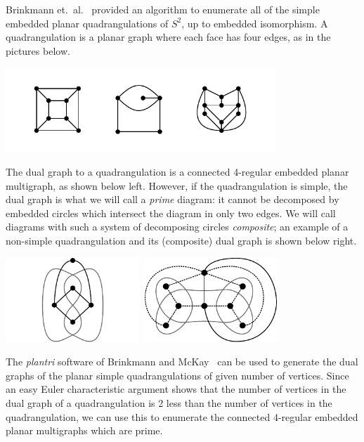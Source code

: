 \documentclass[amsmath,secnumarabic,floatfix,amssymb,nofootinbib,nobibnotes,letterpaper,11pt,tightenlines,showkeys]{revtex4}
\theoremstyle{definition}
\newcommand{\plantri}{\textit{plantri} }
\begin{document}
Brinkmann et.\ al.~\cite{Brinkmann:2007up} provided an algorithm to enumerate all of the simple embedded planar quadrangulations of $S^2$, up to embedded isomorphism. A quadrangulation is a planar graph where each face has four edges, as in the pictures below.
\begin{center}
\includegraphics[height=1.25in]{quadrangulations-example}
\end{center}
The dual graph to a quadrangulation is a connected 4-regular embedded planar multigraph, as shown below left. However, if the quadrangulation is simple, the dual graph is what we will call a \emph{prime} diagram: it cannot be decomposed by embedded circles which intersect the diagram in only two edges. We will call diagrams with such a system of decomposing circles \emph{composite}; an example of a non-simple quadrangulation and its (composite) dual graph is shown below right.
\begin{center}
\hphantom{.}
\hfill
\includegraphics[height=1.25in]{quadrangulation} \hfill
\includegraphics[height=1.25in]{non-simple-quadrangulation}
\hfill
\hphantom{.}
\end{center}
The \plantri software of Brinkmann and McKay~\cite{Brinkmann:2007up,McKay:1998wa} can be used to generate the dual graphs of the planar simple quadrangulations of given number of vertices. Since an easy Euler characteristic argument shows that the number of vertices in the dual graph of a quadrangulation is 2 less than the number of vertices in the quadrangulation, we can use this to enumerate the connected 4-regular embedded planar multigraphs which are prime.
\end{document}
